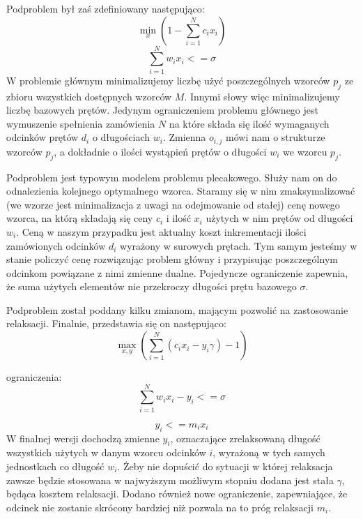 Podproblem był zaś zdefiniowany następująco:
\begin{equation}
   \min_x (1 - \sum_{i=1}^{N} c_i x_i )
\end{equation}
\begin{equation}
    \sum_{i=1}^{N} w_i x_i <= \sigma
\end{equation}
W problemie głównym minimalizujemy liczbę użyć poszczególnych wzorców \(p_j\) ze zbioru wszystkich dostępnych wzorców \(M\). Innymi słowy więc minimalizujemy liczbę bazowych prętów. Jedynym ograniczeniem problemu głównego jest wymuszenie spełnienia zamówienia \(N\) na które składa się ilość wymaganych odcinków prętów \(d_i\) o długościach \(w_i\). Zmienna \(o_{i,j}\) mówi nam o strukturze wzorców \(p_j\), a dokładnie o ilości wystąpień prętów o długości \(w_i\) we wzorcu \(p_j\). 

Podproblem jest typowym modelem problemu plecakowego. Służy nam on do odnalezienia kolejnego optymalnego wzorca. Staramy się w nim zmaksymalizować (we wzorze jest minimalizacja z uwagi na odejmowanie od stałej) cenę nowego wzorca, na którą składają się ceny \(c_i\) i ilość \(x_i\) użytych w nim prętów od długości \(w_i\). Ceną w naszym przypadku jest aktualny koszt inkrementacji ilości zamówionych odcinków \(d_i\) wyrażony w surowych prętach. Tym samym jesteśmy w stanie policzyć cenę rozwiązując problem główny i przypisując poszczególnym odcinkom powiązane z nimi zmienne dualne.
Pojedyncze ograniczenie zapewnia, że suma użytych elementów nie przekroczy długości prętu bazowego \(\sigma\).

Podproblem został poddany kilku zmianom, mającym pozwolić na zastosowanie relaksacji. Finalnie, przedstawia się on następująco:
\begin{equation}
    \max_{x,y} (\sum_{i=1}^{N} (c_i x_i - y_i \gamma) - 1)
\label{podproblemRelaks}
\end{equation}

ograniczenia:
\begin{equation}
    \sum_{i=1}^{N} w_i x_i - y_i <= \sigma
\label{ograniczenie1}
\end{equation}

\begin{equation}
    y_i <= m_i x_i
\label{ograniczenie2}
\end{equation}
W finalnej wersji dochodzą zmienne \(y_i\), oznaczające zrelaksowaną długość wszystkich użytych w danym wzorcu odcinków \(i\), wyrażoną w tych samych jednostkach co długość \(w_i\). Żeby nie dopuścić do sytuacji w której relaksacja zawsze będzie stosowana w najwyższym możliwym stopniu dodana jest stała \(\gamma\), będąca kosztem relaksacji. Dodano również nowe ograniczenie, zapewniające, że odcinek nie zostanie skrócony bardziej niż pozwala na to próg relaksacji \(m_i\).

